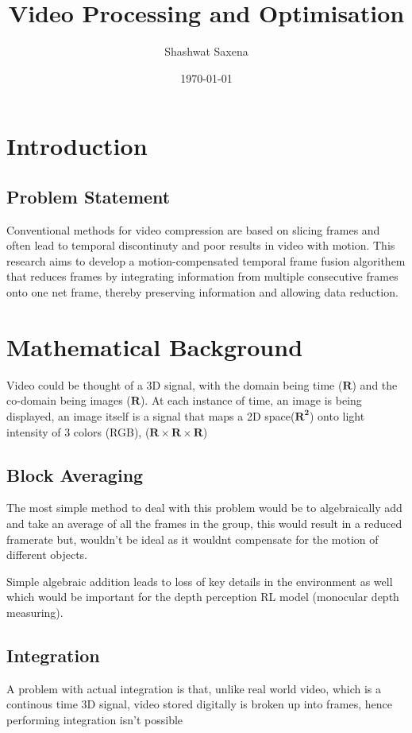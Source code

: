 \documentclass[a4paper,12pt]{article}
\title{Video Processing and Optimisation}
\author{Shashwat Saxena}
\date{\today}
\begin{document}
\maketitle



\section{Introduction}

\subsection{Problem Statement}
Conventional methods for video compression are based on slicing frames and often lead to temporal discontinuty and poor results in video with motion. This research aims to develop a motion-compensated temporal frame fusion algorithem that reduces frames by integrating information from multiple consecutive frames onto one net frame, thereby preserving information and allowing data reduction.

\section{Mathematical Background}
Video could be thought of a 3D signal, with the domain being time ($\mathbf{R}$) and the co-domain being images ($\mathbf{R}$). At each instance of time, an image is being displayed, an image itself is a signal that maps a 2D space($\mathbf{R^2}$) onto light intensity of 3 colors (RGB), ($\mathbf{R} \times \mathbf{R} \times \mathbf{R}$)

\subsection{Block Averaging}
The most simple method to deal with this problem would be to algebraically add and take an average of all the frames in the group, this would result in a reduced framerate but, wouldn't be ideal as it wouldnt compensate for the motion of different objects.

Simple algebraic addition leads to loss of key details in the environment as well which would be important for the depth perception RL model (monocular depth measuring).


\subsection{Integration}
A problem with actual integration is that, unlike real world video, which is a continous time 3D signal, video stored digitally is broken up into frames, hence performing integration isn't possible
\end{document}
